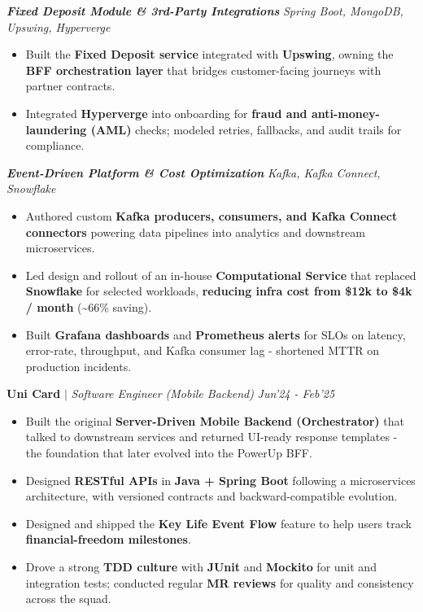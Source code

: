 \documentclass[9pt]{extarticle}
\begin{document}
\vspace{1.5mm}
\textbf{\textit{Fixed Deposit Module \& 3rd-Party Integrations}} \hfill \textit{Spring Boot, MongoDB, Upswing, Hyperverge}
\begin{itemize}
    \item Built the \textbf{Fixed Deposit service} integrated with \textbf{Upswing}, owning the \textbf{BFF orchestration layer} that bridges customer-facing journeys with partner contracts.
    \item Integrated \textbf{Hyperverge} into onboarding for \textbf{fraud and anti-money-laundering (AML)} checks; modeled retries, fallbacks, and audit trails for compliance.
\end{itemize}

\vspace{1.5mm}
\textbf{\textit{Event-Driven Platform \& Cost Optimization}} \hfill \textit{Kafka, Kafka Connect, Snowflake}
\begin{itemize}
    \item Authored custom \textbf{Kafka producers, consumers, and Kafka Connect connectors} powering data pipelines into analytics and downstream microservices.
    \item Led design and rollout of an in-house \textbf{Computational Service} that replaced \textbf{Snowflake} for selected workloads, \textbf{reducing infra cost from \$12k to \$4k / month} (\textasciitilde66\% saving).
    \item Built \textbf{Grafana dashboards} and \textbf{Prometheus alerts} for SLOs on latency, error-rate, throughput, and Kafka consumer lag - shortened MTTR on production incidents.
\end{itemize}

\hspace{-1.5mm}\textbf{Uni Card} $|$ \textit{Software Engineer (Mobile Backend)} \hfill\hfill\textit{Jun'24 - Feb'25}
\begin{itemize}
    \item Built the original \textbf{Server-Driven Mobile Backend (Orchestrator)} that talked to downstream services and returned UI-ready response templates - the foundation that later evolved into the PowerUp BFF.
    \item Designed \textbf{RESTful APIs} in \textbf{Java + Spring Boot} following a microservices architecture, with versioned contracts and backward-compatible evolution.
    \item Designed and shipped the \textbf{Key Life Event Flow} feature to help users track \textbf{financial-freedom milestones}.
    \item Drove a strong \textbf{TDD culture} with \textbf{JUnit} and \textbf{Mockito} for unit and integration tests; conducted regular \textbf{MR reviews} for quality and consistency across the squad.
\end{itemize}
\end{document}
